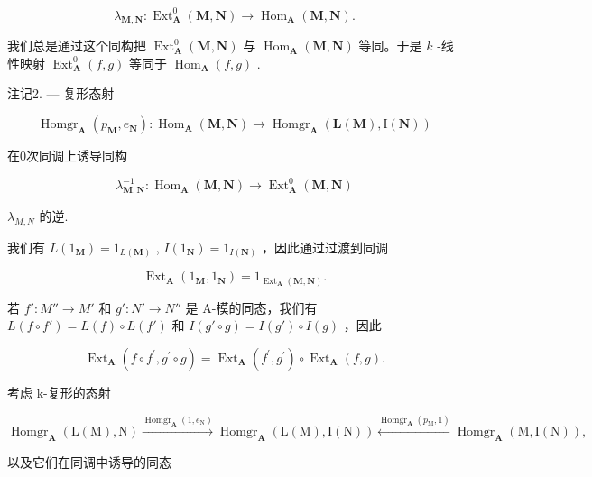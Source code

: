 \[
\lambda_ {\mathbf {M}, \mathbf {N}}: \operatorname{Ext} _ {\mathbf {A}} ^ {0} (\mathbf {M}, \mathbf {N}) \rightarrow \operatorname{Hom} _ {\mathbf {A}} (\mathbf {M}, \mathbf {N}).\tag{7}
\]

我们总是通过这个同构把 \(\operatorname{Ext}_{\mathbf{A}}^{0}(\mathbf{M},\mathbf{N})\) 与 \(\operatorname{Hom}_{\mathbf{A}}(\mathbf{M},\mathbf{N})\) 等同。于是 \(k\) -线性映射 \(\operatorname{Ext}_{\mathbf{A}}^{0}(f,g)\) 等同于 \(\operatorname{Hom}_{\mathbf{A}}(f,g)\) .

注记2. --- 复形态射

\[
\operatorname{Homgr} _ {\mathbf {A}} \left(p _ {\mathbf {M}}, e _ {\mathbf {N}}\right): \operatorname{Hom} _ {\mathbf {A}} (\mathbf {M}, \mathbf {N}) \rightarrow \operatorname{Homgr} _ {\mathbf {A}} \left(\mathbf {L} (\mathbf {M}), \mathrm{I} (\mathbf {N})\right)
\]

在0次同调上诱导同构

\[
\lambda_ {\mathbf {M}, \mathbf {N}} ^ {- 1}: \operatorname{Hom} _ {\mathbf {A}} (\mathbf {M}, \mathbf {N}) \rightarrow \operatorname{Ext} _ {\mathbf {A}} ^ {0} (\mathbf {M}, \mathbf {N})
\]

\(\lambda_{M,N}\) 的逆.

我们有 \(L(1_{\mathbf{M}}) = 1_{L(\mathbf{M})}\) , \(I(1_{\mathbf{N}}) = 1_{I(\mathbf{N})}\) ，因此通过过渡到同调

\[
\operatorname{Ext} _ {\mathbf {A}} \left(1 _ {\mathbf {M}}, 1 _ {\mathbf {N}}\right) = 1 _ {\operatorname{Ext} _ {\mathbf {A}} (\mathbf {M}, \mathbf {N})}.\tag{8}
\]

若 \(f': M'' \to M'\) 和 \(g': N' \to N''\) 是 A-模的同态，我们有 \(L(f \circ f') = L(f) \circ L(f')\) 和 \(I(g' \circ g) = I(g') \circ I(g)\) ，因此

\[
\operatorname{Ext} _ {\mathbf {A}} \left(f \circ f ^ {\prime}, g ^ {\prime} \circ g\right) = \operatorname{Ext} _ {\mathbf {A}} \left(f ^ {\prime}, g ^ {\prime}\right) \circ \operatorname{Ext} _ {\mathbf {A}} (f, g).\tag{9}
\]

考虑 k-复形的态射

\[
\operatorname{Homgr} _ {\mathbf {A}} (\mathrm{L} (\mathrm{M}), \mathrm{N}) \xrightarrow {\operatorname{Homgr} _ {\mathbf {A}} (1 , e _ {\mathrm{N}})} \operatorname{Homgr} _ {\mathbf {A}} (\mathrm{L} (\mathrm{M}), \mathrm{I} (\mathrm{N})) \xleftarrow {\operatorname{Homgr} _ {\mathbf {A}} (p _ {\mathrm{M}}, 1)} \operatorname{Homgr} _ {\mathbf {A}} (\mathrm{M}, \mathrm{I} (\mathrm{N})),
\]

以及它们在同调中诱导的同态

